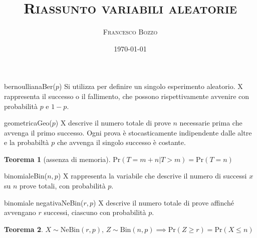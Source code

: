 \documentclass[
	,a4paper
	,12pt
	,oneside
]{article}
\title{\textsc{Riassunto variabili aleatorie}}
\author{\textsc{Francesco Bozzo}}
\date{\today}
\newtheorem*{theorem}{Teorema}
\begin{document}
\maketitle

\begin{aleatoria}{bernoulliana}{Ber(\(p\))}
	Si utilizza per definire un singolo esperimento aleatorio. X rappresenta il successo o il fallimento, che possono rispettivamente avvenire con probabilità \(p\) e \(1-p\).

\end{aleatoria}

\begin{aleatoria}{geometrica}{Geo(\(p\))}
	X descrive il numero totale di prove \(n\) necessarie prima che avvenga il primo successo. Ogni prova è stocasticamente indipendente dalle altre e la probabiltà \(p\) che avvenga il singolo successo è costante.

	\begin{theorem}[assenza di memoria]
		\(\text{Pr}(T=m+n|T>m) = \text{Pr}(T=n)\)
	\end{theorem}
\end{aleatoria}

\begin{aleatoria}{binomiale}{Bin(\(n, p\))}
	X rappresenta la variabile che descrive il numero di successi \(x\) su \(n\) prove totali, con probabilità \(p\).

\end{aleatoria}

\begin{aleatoria}{binomiale negativa}{NeBin(\(r, p\))}
	X descrive il numero totale di prove affinché avvengano \(r\) successi, ciascuno con probabilità \(p\).

	\begin{theorem}
		\(X\sim\text{NeBin}(r,p)\text{, } Z\sim\text{Bin}(n,p) \implies \text{Pr}(Z\geqslant r) = \text{Pr}(X\leqslant n)\)
	\end{theorem}
\end{aleatoria}
\end{document}

